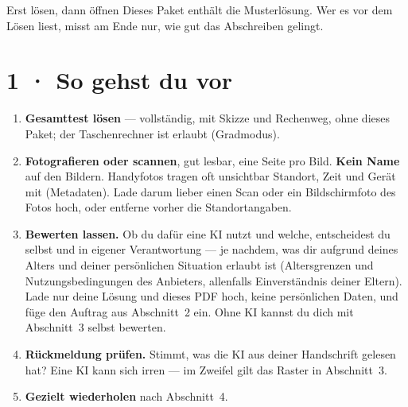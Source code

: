 \documentclass[11pt]{article}
\begin{document}

\begin{lpachtung}{Erst lösen, dann öffnen}
Dieses Paket enthält die Musterlösung. Wer es vor dem Lösen liest, misst am Ende nur, wie gut das Abschreiben gelingt.
\end{lpachtung}

\section*{1 · So gehst du vor}
\begin{enumerate}[leftmargin=*,itemsep=0pt]
\item \textbf{Gesamttest lösen} — vollständig, mit Skizze und Rechenweg, ohne dieses Paket; der Taschenrechner ist erlaubt (Gradmodus).
\item \textbf{Fotografieren oder scannen}, gut lesbar, eine Seite pro Bild. \textbf{Kein Name} auf den Bildern.
  Handyfotos tragen oft unsichtbar Standort, Zeit und Gerät mit (Metadaten). Lade darum lieber einen Scan oder ein
  Bildschirmfoto des Fotos hoch, oder entferne vorher die Standortangaben.
\item \textbf{Bewerten lassen.} Ob du dafür eine KI nutzt und welche, entscheidest du selbst und in eigener Verantwortung —
  je nachdem, was dir aufgrund deines Alters und deiner persönlichen Situation erlaubt ist (Altersgrenzen und
  Nutzungsbedingungen des Anbieters, allenfalls Einverständnis deiner Eltern). Lade nur deine Lösung und dieses PDF hoch,
  keine persönlichen Daten, und füge den Auftrag aus Abschnitt~2 ein. Ohne KI kannst du dich mit Abschnitt~3 selbst bewerten.
\item \textbf{Rückmeldung prüfen.} Stimmt, was die KI aus deiner Handschrift gelesen hat? Eine KI kann sich irren —
  im Zweifel gilt das Raster in Abschnitt~3.
\item \textbf{Gezielt wiederholen} nach Abschnitt~4.
\end{enumerate}

\end{document}
